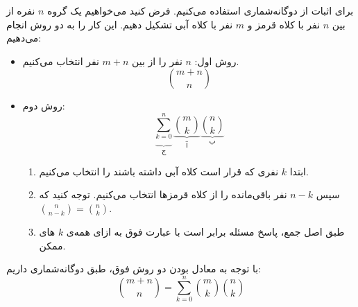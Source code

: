 \p
برای اثبات از دوگانه‌شماری استفاده می‌کنیم.
فرض کنید می‌خواهیم
یک گروه 
$n$
نفره 
از بین
$n$ 
نفر با کلاه قرمز و
$m$
نفر با کلاه آبی تشکیل دهیم.
این کار را به دو روش انجام می‌دهیم:
\begin{itemize}
    \item 
    روش اول: 
    $n$
    نفر را از بین 
    $m + n$
    نفر انتخاب می‌کنیم.  
    $$\binom{m + n}{n}$$
    
    \item 
    روش دوم: 
    $$ \underbrace{\sum\limits_{k=0}^{n}}_{\text{ج}} \underbrace{\binom{m}{k}}_{\text{آ}} \underbrace{\binom{n}{k}}_{\text{ب}}$$
    \begin{enumerate}
    \item 
    ابتدا 
    $k$ 
    نفری که قرار است کلاه آبی داشته باشند را انتخاب می‌کنیم.
    \item 
    سپس 
    $n-k$ 
    نفر باقی‌مانده را از کلاه قرمزها انتخاب می‌کنیم. توجه کنید که
    $ \binom{n}{n-k} = \binom{n}{k}$.
    \item
     طبق اصل جمع،
    پاسخ مسئله برابر است با عبارت فوق 
     به ازای همه‌ی 
     $k$
     های ممکن.
    \end{enumerate}
\end{itemize}
با توجه به معادل بودن دو روش فوق، طبق دوگانه‌شماری داریم:
$$\binom{m + n}{n} = \sum\limits_{k=0}^{n} \binom{m}{k} \binom{n}{k}$$